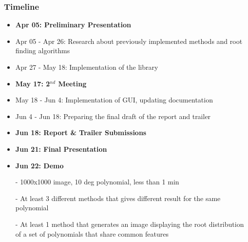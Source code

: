 \documentclass{beamer}
\begin{document}
\begin{contents}
	\frametitle{{\color{white} Timeline}}
	\begin{itemize}
	    \item \textbf{Apr 05: Preliminary Presentation}
	    \item Apr 05 - Apr 26: Research about previously implemented methods and root finding algorithms
	    \item Apr 27 - May 18: Implementation of the library
	    \item \textbf{May 17: 2$^{nd}$ Meeting}
	    \item May 18 - Jun 4: Implementation of GUI, updating documentation
            \item Jun 4 - Jun 18: Preparing the final draft of the report and trailer
	    \item \textbf{Jun 18: Report & Trailer Submissions}
	    \item \textbf{Jun 21: Final Presentation}
	    \item \textbf{Jun 22: Demo}
	\end{itemize}
\end{contents}

\begin{projectsuccess}
    \begin{itemize}[leftmargin=*]
        \item[-] 1000x1000 image, 10 deg polynomial, less than 1 min
        \item[-] At least 3 different methods that gives different result for the same polynomial
        \item[-] At least 1 method that generates an image displaying the root distribution of a set of polynomials that share common features
    \end{itemize}
\end{projectsuccess}

\begin{projectreferences}
    \footnotesize
\end{projectreferences}
\end{document}
